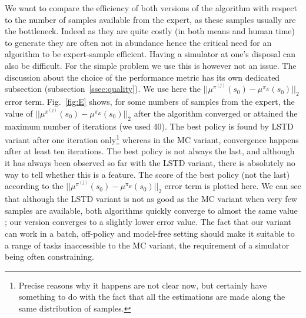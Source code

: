 \documentclass{llncs}
\begin{document}
We want to compare the efficiency of both versions of the algorithm with respect to the number of samples available from the expert, as these samples usually are the bottleneck. Indeed as they are quite costly (in both means and human time) to generate they are often not in abundance hence the critical need for an algorithm to be expert-sample efficient. Having a simulator at one's disposal can also be difficult. For the simple problem we use this is however not an issue. The discussion about the choice of the performance metric has its own dedicated subsection (subsection~\ref{ssec:quality}). We use here the $||\mu^{\pi^{(j)}}(s_0) - \mu^{\pi_E}(s_0)||_2$ error term. Fig.~\ref{fig:E} shows, for some numbers of samples from the expert, the value of $||\mu^{\pi^{(j)}}(s_0)-\mu^{\pi_E}(s_0)||_2$ after the algorithm converged or attained the maximum number of iterations (we used 40). The best policy is found by LSTD variant after one iteration only\footnote{Precise reasons why it happens are not clear now, but certainly have something to do with the fact that all the estimations are made along the same distribution of samples.} whereas in the MC variant, convergence happens after at least ten iterations. The best policy is not always the last, and although it has always been observed so far with the LSTD variant, there is absolutely no way to tell whether this is a feature. The score of the best policy (not the last) according to the $||\mu^{\pi^{(j)}}(s_0) - \mu^{\pi_E}(s_0)||_2$ error term is plotted here. We can see that although the LSTD variant is not as good as the MC variant when very few samples are available, both algorithms quickly converge to almost the same value ; our version converges to a slightly lower error value. The fact that our variant can work in a batch, off-policy and model-free setting should make it suitable to a range of tasks inaccessible to the MC variant, the requirement of a simulator being often constraining.
\end{document}
